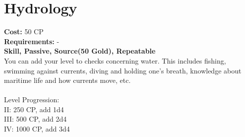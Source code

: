 \section{Hydrology}
\textbf{Cost:} 50 CP\\
\textbf{Requirements:} -\\
\textbf{Skill, Passive, Source(50 Gold), Repeatable}\\
You can add your level to checks concerning water. This includes fishing, swimming against currents, diving and holding one's breath, knowledge about maritime life and how currents move, etc.\\
\\
Level Progression:\\
II: 250 CP, add 1d4\\
III: 500 CP, add 2d4\\
IV: 1000 CP, add 3d4\\